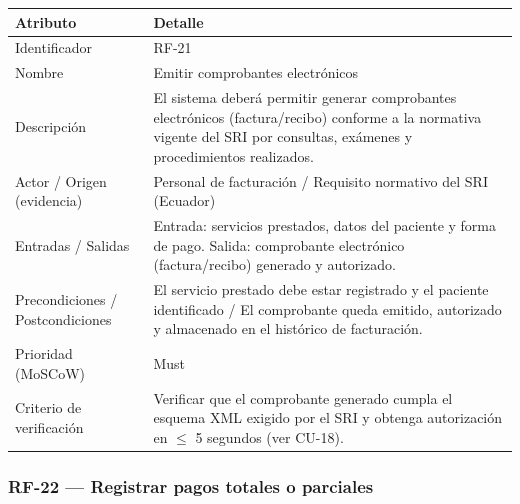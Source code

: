 \documentclass[11pt,a4paper]{article}
\begin{document}
	\begin{longtable}{p{} p{}}
		
		\toprule
		\textbf{Atributo} & \textbf{Detalle} \\
		\midrule
		\endhead
		
		Identificador & RF-21 \\
		Nombre & Emitir comprobantes electrónicos \\
		Descripción & El sistema deberá permitir generar comprobantes electrónicos (factura/recibo) conforme a la normativa vigente del SRI por consultas, exámenes y procedimientos realizados. \\
		Actor / Origen (evidencia) & Personal de facturación / Requisito normativo del SRI (Ecuador) \\
		Entradas / Salidas & Entrada: servicios prestados, datos del paciente y forma de pago. Salida: comprobante electrónico (factura/recibo) generado y autorizado. \\
		Precondiciones / Postcondiciones & El servicio prestado debe estar registrado y el paciente identificado / El comprobante queda emitido, autorizado y almacenado en el histórico de facturación. \\
		Prioridad (MoSCoW) & Must \\
		Criterio de verificación & Verificar que el comprobante generado cumpla el esquema XML exigido por el SRI y obtenga autorización en \(\leq\) 5 segundos (ver CU-18). \\
		\bottomrule
	\end{longtable}
	
	\subsubsection{RF-22 --- Registrar pagos totales o parciales}
	
\end{document}
